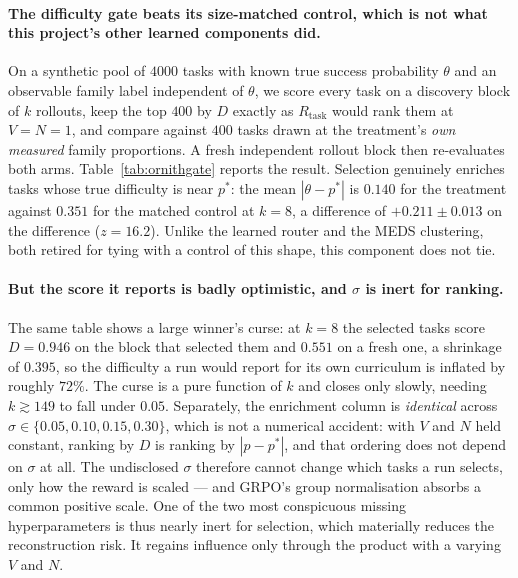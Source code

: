 \paragraph{The difficulty gate beats its size-matched control, which is not what this
project's other learned components did.} On a synthetic pool of $4000$ tasks with known
true success probability $\theta$ and an observable family label independent of $\theta$,
we score every task on a discovery block of $k$ rollouts, keep the top $400$ by $D$
exactly as $R_{\mathrm{task}}$ would rank them at $V=N=1$, and compare against $400$ tasks
drawn at the treatment's \emph{own measured} family proportions. A fresh independent
rollout block then re-evaluates both arms. Table~\ref{tab:ornithgate} reports the result.
Selection genuinely enriches tasks whose true difficulty is near $p^*$: the mean
$|\theta-p^*|$ is $0.140$ for the treatment against $0.351$ for the matched control at
$k=8$, a difference of $+0.211 \pm 0.013$ on the difference ($z=16.2$). Unlike the learned
router and the MEDS clustering, both retired for tying with a control of this shape, this
component does not tie.

\paragraph{But the score it reports is badly optimistic, and $\sigma$ is inert for
ranking.} The same table shows a large winner's curse: at $k=8$ the selected tasks score
$D=0.946$ on the block that selected them and $0.551$ on a fresh one, a shrinkage of
$0.395$, so the difficulty a run would report for its own curriculum is inflated by
roughly $72\%$. The curse is a pure function of $k$ and closes only slowly, needing
$k\gtrsim149$ to fall under $0.05$. Separately, the enrichment column is \emph{identical}
across $\sigma\in\{0.05,0.10,0.15,0.30\}$, which is not a numerical accident: with $V$ and
$N$ held constant, ranking by $D$ is ranking by $|\hat{p}-p^*|$, and that ordering does not
depend on $\sigma$ at all. The undisclosed $\sigma$ therefore cannot change which tasks a
run selects, only how the reward is scaled --- and GRPO's group normalisation absorbs a
common positive scale. One of the two most conspicuous missing hyperparameters is thus
nearly inert for selection, which materially reduces the reconstruction risk. It regains
influence only through the product with a varying $V$ and $N$.

